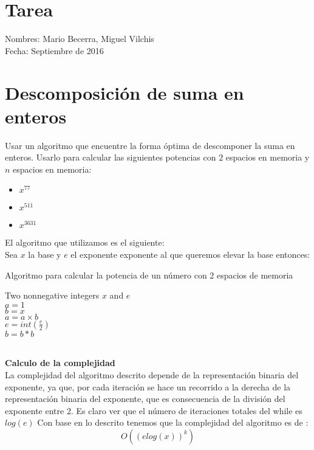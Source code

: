 \documentclass{article}
\begin{document}
\section*{Tarea}

Nombres: Mario Becerra, Miguel Vilchis \\
Fecha: Septiembre de 2016


\section{Descomposición de suma en enteros}

Usar un algoritmo que encuentre la forma óptima de descomponer la suma en enteros. Usarlo para calcular las siguientes potencias con $2$ espacios en memoria y $n$ espacios en memoria:

\begin{multicols}{3}
    \begin{itemize}
        \item $x^{77}$
        \item $x^{511}$
        \item $x^{3631}$
    \end{itemize}
    \end{multicols}
El algoritmo que utilizamos es el siguiente: \\
Sea $x$ la base y $e$ el exponente exponente al que queremos elevar la base entonces:\\
\begin{algorithm}[h!]
\caption{Algoritmo para calcular la potencia de un número con 2 espacios de memoria}\label{euclid}
  \begin{algorithmic}
    \Require Two nonnegative integers $x$ and $e$\\
    $a = 1$\\
    $b = x$
    \indent {} \\
    \indent \indent $a = a \times b$ 
    \indent \EndIf \\
    \indent \indent$e = int(\frac{e}{2})$ 
    \indent {} \\
    \indent \indent $b = b*b$ 
    \indent \EndIf 
    \EndWhile
  \end{algorithmic}
\end{algorithm}\\
\textbf{Calculo de la complejidad}\\
La complejidad del algoritmo descrito depende de la representación binaria del exponente, ya que, por cada iteración se hace un recorrido a la derecha de la representación binaria del exponente, que es consecuencia de la división del exponente entre 2. Es claro ver que el número de iteraciones totales del while es $log(e)$ Con base en lo descrito tenemos que la complejidad del algoritmo es de :
\[ O((e log(x))^k)\]
\end{document}
